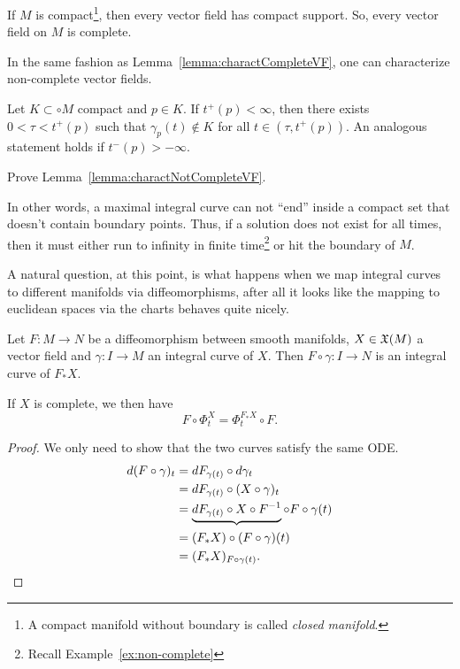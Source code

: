 \begin{corollary}
  If $M$ is compact\footnote{A compact manifold without boundary is called \emph{closed manifold}.}, then every vector field has compact support.
  So, every vector field on $M$ is complete.
\end{corollary}

In the same fashion as Lemma~\ref{lemma:charactCompleteVF}, one can characterize non-complete vector fields.

\begin{lemma}\label{lemma:charactNotCompleteVF}
  Let $K\subset \circ M$ compact and $p\in K$.
  If $t^+(p) < \infty$, then there exists $0<\tau<t^+(p)$ such that $\gamma_p(t)\not\in K$ for all $t\in (\tau, t^+(p))$.
  An analogous statement holds if $t^-(p) > -\infty$.
\end{lemma}

\begin{exercise}
  Prove Lemma~\ref{lemma:charactNotCompleteVF}.
\end{exercise}

In other words, a maximal integral curve can not ``end'' inside a compact set that doesn't contain boundary points.
Thus, if a solution does not exist for all times, then it must either run to infinity in finite time\footnote{Recall Example~\ref{ex:non-complete}} or hit the boundary of $M$.

A natural question, at this point, is what happens when we map integral curves to different manifolds via diffeomorphisms, after all it looks like the mapping to euclidean spaces via the charts behaves quite nicely.

\begin{proposition}\label{prop:conjpfX}
  Let $F: M \to N$ be a diffeomorphism between smooth manifolds, $X\in\mathfrak{X}(M)$ a vector field and $\gamma:I\to M$ an integral curve of $X$. Then $F\circ\gamma : I \to N$ is an integral curve of $F_* X$.

  If $X$ is complete, we then have
  \begin{equation}
    F\circ\Phi_t^X = \Phi_t^{F_* X}\circ F.
  \end{equation}
\end{proposition}
\begin{proof}
  We only need to show that the two curves satisfy the same ODE.
  \begin{align*}
    d(F\circ \gamma)_t 
    &= dF_{\gamma(t)} \circ d\gamma_t \\
    &= dF_{\gamma(t)} \circ (X \circ \gamma)_t \\
    &= \LaTeXunderbrace{dF_{\gamma(t)} \circ X \circ F^{-1}} \circ F \circ \gamma(t) \\
    &= (F_* X) \circ (F\circ \gamma)(t) \\
    &= (F_* X)_{F\circ\gamma(t)}.
  \end{align*}
\end{proof}

